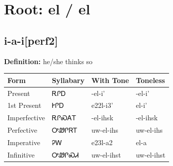 \documentclass{article}%
\begin{document}
%
\normalsize%
\section*{Root: el / el}%
\subsection*{i-a-i[perf2]}%
\textbf{Definition: }%
he/she thinks so%
\\[0.5em]%
\begin{tabular}{|l|l|l|l|}%
\hline%
\textbf{Form}&\textbf{Syllabary}&\textbf{With Tone}&\textbf{Toneless}\\%
\hline%
Present&ᎡᎵᎠ&{-}el{-}i'&{-}el{-}i'\\%
1st Present&ᎨᎵᎠ&e22l{-}i3'&el{-}i'\\%
Imperfective&ᎡᎵᏍᎪᎢ&{-}el{-}ihsk&{-}el{-}ihsk\\%
Perfective&ᎤᏪᎵᏒᎢ&uw{-}el{-}ihs&uw{-}el{-}ihs\\%
Imperative&ᎮᎳ&e23l{-}a2&el{-}a\\%
Infinitive&ᎤᏪᎵᏍᏗ&uw{-}el{-}ihst&uw{-}el{-}ihst\\%
\hline%
\end{tabular}%
\\[1em]%
\end{document}
